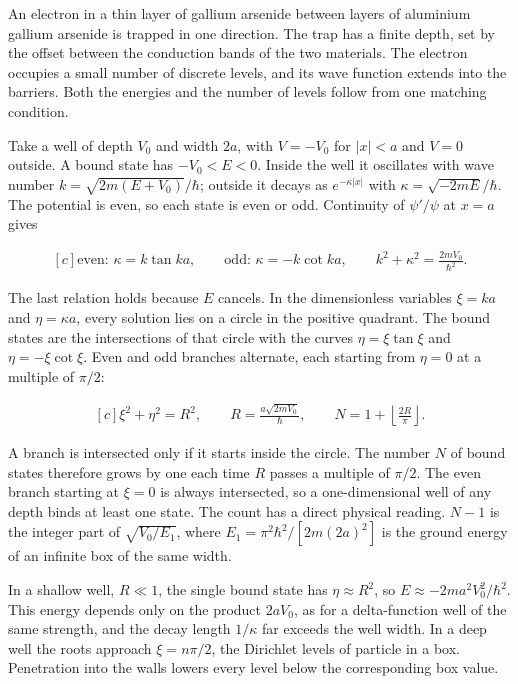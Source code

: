 \documentclass[11pt,oneside]{book}
\newenvironment{centeredalign}{\[\begin{gathered}[c]}{\end{gathered}\]}
\begin{document}
\label{topic:potential-well}

An electron in a thin layer of gallium arsenide between layers of aluminium gallium arsenide is trapped in one direction. The trap has a finite depth, set by the offset between the conduction bands of the two materials. The electron occupies a small number of discrete levels, and its wave function extends into the barriers. Both the energies and the number of levels follow from one matching condition.

Take a well of depth \(V_0\) and width \(2a\), with \(V=-V_0\) for \(|x|<a\) and \(V=0\) outside. A bound state has \(-V_0<E<0\). Inside the well it oscillates with wave number \(k=\sqrt{2m(E+V_0)}/\hbar\); outside it decays as \(e^{-\kappa|x|}\) with \(\kappa=\sqrt{-2mE}/\hbar\). The potential is even, so each state is even or odd. Continuity of \(\psi'/\psi\) at \(x=a\) gives

\begin{centeredalign}
\text{even: }\kappa=k\tan ka,\qquad \text{odd: }\kappa=-k\cot ka,\qquad
k^2+\kappa^2=\frac{2mV_0}{\hbar^2}.
\end{centeredalign}

The last relation holds because \(E\) cancels. In the dimensionless variables \(\xi=ka\) and \(\eta=\kappa a\), every solution lies on a circle in the positive quadrant. The bound states are the intersections of that circle with the curves \(\eta=\xi\tan\xi\) and \(\eta=-\xi\cot\xi\). Even and odd branches alternate, each starting from \(\eta=0\) at a multiple of \(\pi/2\):

\begin{centeredalign}
\xi^2+\eta^2=R^2,\qquad R=\frac{a\sqrt{2mV_0}}{\hbar},\qquad
N=1+\left\lfloor\frac{2R}{\pi}\right\rfloor.
\end{centeredalign}

A branch is intersected only if it starts inside the circle. The number \(N\) of bound states therefore grows by one each time \(R\) passes a multiple of \(\pi/2\). The even branch starting at \(\xi=0\) is always intersected, so a one-dimensional well of any depth binds at least one state. The count has a direct physical reading. \(N-1\) is the integer part of \(\sqrt{V_0/E_1}\), where \(E_1=\pi^2\hbar^2/[2m(2a)^2]\) is the ground energy of an infinite box of the same width.

In a shallow well, \(R\ll1\), the single bound state has \(\eta\approx R^2\), so \(E\approx-2ma^2V_0^2/\hbar^2\). This energy depends only on the product \(2aV_0\), as for a delta-function well of the same strength, and the decay length \(1/\kappa\) far exceeds the well width. In a deep well the roots approach \(\xi=n\pi/2\), the Dirichlet levels of particle in a box. Penetration into the walls lowers every level below the corresponding box value.
\end{document}
